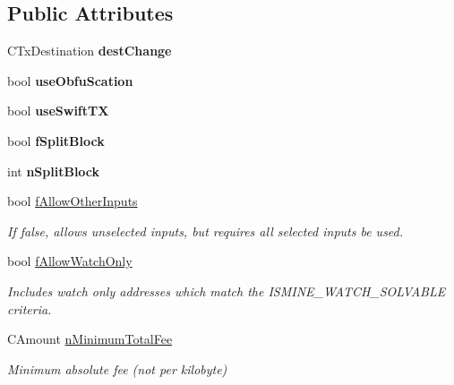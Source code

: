 \subsection*{Public Attributes}
\begin{DoxyCompactItemize}
\item 
\mbox{\label{class_c_coin_control_aa991ffd830267f6c2103fa7e03213f41}} 
C\+Tx\+Destination {\bfseries dest\+Change}
\item 
\mbox{\label{class_c_coin_control_a34c74f6fa2f58c1adb80602fd67c9e92}} 
bool {\bfseries use\+Obfu\+Scation}
\item 
\mbox{\label{class_c_coin_control_a4e1471ca5bf0dfc84b95e6fa7eeeb722}} 
bool {\bfseries use\+Swift\+TX}
\item 
\mbox{\label{class_c_coin_control_acad36178a2488dc978a39fbee43453f3}} 
bool {\bfseries f\+Split\+Block}
\item 
\mbox{\label{class_c_coin_control_ac75208bc1c4e0fad9de35997ee24d766}} 
int {\bfseries n\+Split\+Block}
\item 
\mbox{\label{class_c_coin_control_acd3e8686c8d78535153ed9fd734ef029}} 
bool \mbox{\hyperlink{class_c_coin_control_acd3e8686c8d78535153ed9fd734ef029}{f\+Allow\+Other\+Inputs}}
\begin{DoxyCompactList}\small\item\em If false, allows unselected inputs, but requires all selected inputs be used. \end{DoxyCompactList}\item 
\mbox{\label{class_c_coin_control_a83d3144efcfdd0e87467f0b2d98b4302}} 
bool \mbox{\hyperlink{class_c_coin_control_a83d3144efcfdd0e87467f0b2d98b4302}{f\+Allow\+Watch\+Only}}
\begin{DoxyCompactList}\small\item\em Includes watch only addresses which match the I\+S\+M\+I\+N\+E\+\_\+\+W\+A\+T\+C\+H\+\_\+\+S\+O\+L\+V\+A\+B\+LE criteria. \end{DoxyCompactList}\item 
\mbox{\label{class_c_coin_control_ae33d88969604e91eea3167f5626a5c82}} 
C\+Amount \mbox{\hyperlink{class_c_coin_control_ae33d88969604e91eea3167f5626a5c82}{n\+Minimum\+Total\+Fee}}
\begin{DoxyCompactList}\small\item\em Minimum absolute fee (not per kilobyte) \end{DoxyCompactList}\end{DoxyCompactItemize}


